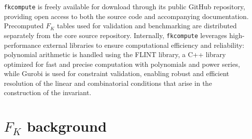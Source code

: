 \documentclass[twocolumn]{article}
\begin{document}
\texttt{fkcompute} is freely available for download through its public GitHub repository, providing open access to both the source code and accompanying documentation. Precomputed $F_K$ tables used for validation and benchmarking are distributed separately from the core source repository.
Internally, \texttt{fkcompute} leverages high-performance external libraries to ensure computational efficiency and reliability: polynomial arithmetic is handled using the FLINT library, a C++ library optimized for fast and precise computation with polynomials and power series, while Gurobi is used for constraint validation, enabling robust and efficient resolution of the linear and combinatorial conditions that arise in the construction of the invariant.

\section{$F_K$ background}

\end{document}
